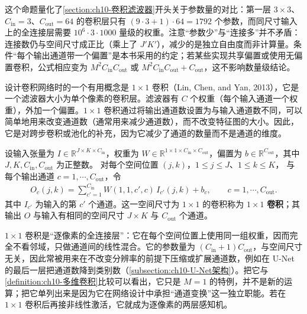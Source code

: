 \documentclass[../../main.tex]{subfiles}
\begin{document}
\begin{remark}
这个命题量化了\cref{section:ch10-卷积滤波器}开头关于参数量的对比：第一层 $3\times 3$、$C_{\mathrm{in}}=3$、$C_{\mathrm{out}}=64$ 的卷积层只有 $(9\cdot3+1)\cdot64=1792$ 个参数，而同尺寸输入上的全连接层需要 $10^6\cdot 3\cdot 1000$ 量级的权重。注意“参数少”与“连接多”并不矛盾：连接数仍与空间尺寸成正比（乘上了 $J'K'$），减少的是独立自由度而非计算量。条件“每个输出通道带一个偏置”是本书采用的约定；若某些实现共享偏置或使用无偏置卷积，公式相应变为 $M^2C_{\mathrm{in}}C_{\mathrm{out}}$ 或 $M^2C_{\mathrm{in}}C_{\mathrm{out}}+C_{\mathrm{out}}$，这不影响数量级结论。
\end{remark}

设计卷积网络时的一个有用概念是 $1\times 1$ 卷积（Lin, Chen, and Yan, 2013），它是一个滤波器大小为单个像素的卷积层。滤波器有 $C$ 个权重（每个输入通道一个权重），外加一个偏置。$1\times 1$ 卷积通过将输出通道数设置为与输入通道数不同，可以简单地用来改变通道数（通常用来减少通道数），而不改变特征图的大小。因此，它是对跨步卷积或池化的补充，因为它减少了通道的数量而不是通道的维度。

\begin{definition}[$1\times 1$ 卷积]\label{definition:ch10-1x1卷积}
设输入张量为 $I\in\mathbb{R}^{J\times K\times C_{\mathrm{in}}}$，权重为
$W\in\mathbb{R}^{1\times1\times C_{\mathrm{in}}\times C_{\mathrm{out}}}$，偏置为
$b\in\mathbb{R}^{C_{\mathrm{out}}}$，其中 $J,K,C_{\mathrm{in}},C_{\mathrm{out}}$ 为正整数。
对每个空间位置 $(j,k)$，$1\leqslant j\leqslant J$、$1\leqslant k\leqslant K$，
与每个输出通道 $c=1,\cdots,C_{\mathrm{out}}$，令
\begin{align}
  O_c(j,k)=\sum_{c'=1}^{C_{\mathrm{in}}} W(1,1,c',c)\,I_{c'}(j,k)+b_c,\qquad c=1,\cdots,C_{\mathrm{out}}.
  \label{align:ch10-1x1卷积}
\end{align}
其中 $I_{c'}$ 为输入的第 $c'$ 个通道。这一空间尺寸为 $1\times1$ 的卷积称为
$1\times1$ \textbf{卷积}；其输出 $O$ 与输入有相同的空间尺寸 $J\times K$ 与
$C_{\mathrm{out}}$ 个通道。
\end{definition}

\begin{remark}
$1\times 1$ 卷积是“逐像素的全连接层”：它在每个空间位置上使用同一组权重，因而完全不看邻域，只做通道间的线性混合。它的参数量为 $(C_{\mathrm{in}}+1)C_{\mathrm{out}}$，与空间尺寸无关，因此常被用来在不改变分辨率的前提下压缩或扩展通道数，例如在 U-Net 的最后一层把通道数降到类别数（\cref{subsection:ch10-U-Net架构}）。把它与\cref{definition:ch10-多维卷积}比较可以看出，它只是 $M=1$ 的特例，并不是新的运算；把它单列出来是因为它在网络设计中承担“通道变换”这一独立职能。若在 $1\times 1$ 卷积后再接非线性激活，它就成为逐像素的两层感知机。
\end{remark}
\end{document}
